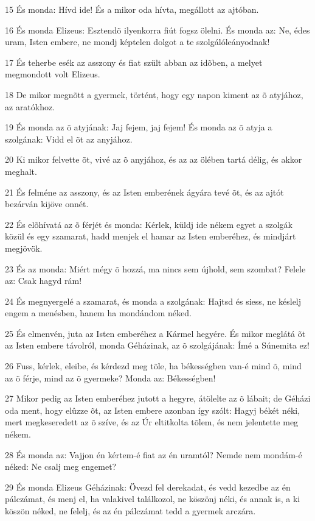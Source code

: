 \par 15 És monda: Hívd ide! És a mikor oda hívta, megállott az ajtóban.
\par 16 És monda Elizeus: Esztendõ ilyenkorra fiút fogsz ölelni. És monda az: Ne, édes uram, Isten embere, ne mondj képtelen dolgot a te szolgálóleányodnak!
\par 17 És teherbe esék az asszony és fiat szült abban az idõben, a melyet megmondott volt Elizeus.
\par 18 De mikor megnõtt a gyermek, történt, hogy egy napon kiment az õ atyjához, az aratókhoz.
\par 19 És monda az õ atyjának: Jaj fejem, jaj fejem! És monda az õ atyja a szolgának: Vidd el õt az anyjához.
\par 20 Ki mikor felvette õt, vivé az õ anyjához, és az az ölében tartá délig, és akkor meghalt.
\par 21 És felméne az asszony, és az Isten emberének ágyára tevé õt, és az ajtót bezárván kijöve onnét.
\par 22 És elõhívatá az õ férjét és monda: Kérlek, küldj ide nékem egyet a szolgák közül és egy szamarat, hadd menjek el hamar az Isten emberéhez, és mindjárt megjövök.
\par 23 És az monda: Miért mégy õ hozzá, ma nincs sem újhold, sem szombat? Felele az: Csak hagyd rám!
\par 24 És megnyergelé a szamarat, és monda a szolgának: Hajtsd és siess, ne késlelj engem a menésben, hanem ha mondándom néked.
\par 25 És elmenvén, juta az Isten emberéhez a Kármel hegyére. És mikor meglátá õt az Isten embere távolról, monda Géházinak, az õ szolgájának: Ímé a Súnemita ez!
\par 26 Fuss, kérlek, eleibe, és kérdezd meg tõle, ha békességben van-é mind õ, mind az õ férje, mind az õ gyermeke? Monda az: Békességben!
\par 27 Mikor pedig az Isten emberéhez jutott a hegyre, átölelte az õ lábait; de Géházi oda ment, hogy elûzze õt, az Isten embere azonban így szólt: Hagyj békét néki, mert megkeseredett az õ szíve, és az Úr eltitkolta tõlem, és nem jelentette meg nékem.
\par 28 És monda az: Vajjon én kértem-é fiat az én uramtól? Nemde nem mondám-é néked: Ne csalj meg engemet?
\par 29 És monda Elizeus Géházinak: Övezd fel derekadat, és vedd kezedbe az én pálczámat, és menj el, ha valakivel találkozol, ne köszönj néki, és annak is, a ki köszön néked, ne felelj, és az én pálczámat tedd a gyermek arczára.
